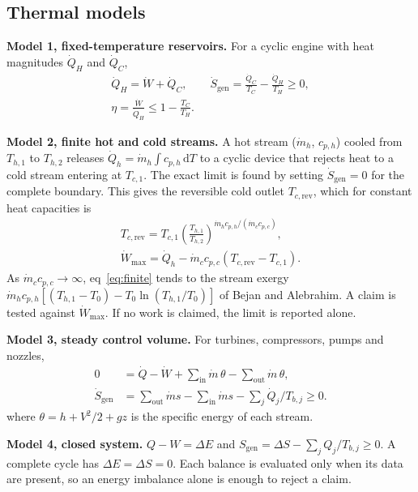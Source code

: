 \documentclass[journal=iecred,manuscript=article,layout=twocolumn,email=false]{achemso}
\begin{document}
\subsection{Thermal models}
\textbf{Model 1, fixed-temperature reservoirs.} For a cyclic engine with heat magnitudes $\dot Q_H$ and $\dot Q_C$,
\begin{gather}
\dot Q_H=\dot W+\dot Q_C,\qquad
\dot S_\mathrm{gen}=\frac{\dot Q_C}{T_C}-\frac{\dot Q_H}{T_H}\ge0,\nonumber\\
\eta=\frac{\dot W}{\dot Q_H}\le1-\frac{T_C}{T_H}.
\label{eq:carnot}
\end{gather}

\textbf{Model 2, finite hot and cold streams.} A hot stream ($\dot m_h$, $c_{p,h}$) cooled from $T_{h,1}$ to $T_{h,2}$
releases $\dot Q_h=\dot m_h\int c_{p,h}\,\mathrm{d}T$ to a cyclic device that rejects heat to a cold stream entering at
$T_{c,1}$. The exact limit is found by setting $\dot S_\mathrm{gen}=0$ for the complete boundary. This gives the
reversible cold outlet $T_{c,\mathrm{rev}}$, which for constant heat capacities is
\begin{gather}
T_{c,\mathrm{rev}}=T_{c,1}\left(\frac{T_{h,1}}{T_{h,2}}\right)^{\dot m_hc_{p,h}/(\dot m_cc_{p,c})},\nonumber\\
\dot W_\mathrm{max}=\dot Q_h-\dot m_cc_{p,c}\left(T_{c,\mathrm{rev}}-T_{c,1}\right).
\label{eq:finite}
\end{gather}
As $\dot m_cc_{p,c}\to\infty$, eq~\ref{eq:finite} tends to the stream exergy
$\dot m_hc_{p,h}[(T_{h,1}-T_0)-T_0\ln(T_{h,1}/T_0)]$ of Bejan and Alebrahim.\cite{Bejan2001} A claim is tested against
$\dot W_\mathrm{max}$. If no work is claimed, the limit is reported alone.

\textbf{Model 3, steady control volume.} For turbines, compressors, pumps and nozzles,
\begin{align}
0&=\dot Q-\dot W+\textstyle\sum_\mathrm{in}\dot m\,\theta-\sum_\mathrm{out}\dot m\,\theta,\\
\dot S_\mathrm{gen}&=\textstyle\sum_\mathrm{out}\dot ms-\sum_\mathrm{in}\dot ms-\sum_j\dot Q_j/T_{b,j}\ge0.
\end{align}
where $\theta=h+V^2/2+gz$ is the specific energy of each stream.

\textbf{Model 4, closed system.} $Q-W=\Delta E$ and $S_\mathrm{gen}=\Delta S-\sum_jQ_j/T_{b,j}\ge0$. A complete cycle has
$\Delta E=\Delta S=0$. Each balance is evaluated only when its data are present, so an energy imbalance alone is enough
to reject a claim.
\end{document}
